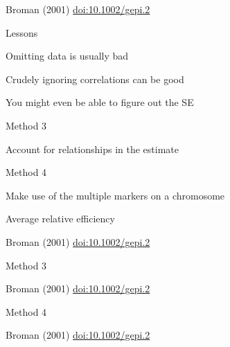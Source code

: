 \documentclass[aspectratio=169,12pt,t]{beamer}
\begin{document}
\begin{frame}[c]{}


\vspace{3mm}

\hfill \footnotesize {\lolit Broman (2001)
  \href{https://doi.org/10.1002/gepi.2}{doi:10.1002/gepi.2}}

\end{frame}


\begin{frame}{Lessons}

  \bbi
  \itemsep36pt
\item Omitting data is usually bad
\item Crudely ignoring correlations can be good
  \bi
\item[] You might even be able to figure out the SE
  \ei
  \ei

  \end{frame}



\begin{frame}{Method 3}

{\hilit Account for relationships in the estimate}


\end{frame}




\begin{frame}{Method 4}

{\hilit Make use of the multiple markers on a chromosome}


\end{frame}





\begin{frame}{Average relative efficiency}

\vspace{10mm}

\hfill \footnotesize {\lolit Broman (2001)
  \href{https://doi.org/10.1002/gepi.2}{doi:10.1002/gepi.2}}

\end{frame}

\begin{frame}{Method 3}

\vspace{18mm}

\hfill \footnotesize {\lolit Broman (2001)
  \href{https://doi.org/10.1002/gepi.2}{doi:10.1002/gepi.2}}

\end{frame}

\begin{frame}{Method 4}

\bigskip

\hfill \footnotesize {\lolit Broman (2001)
  \href{https://doi.org/10.1002/gepi.2}{doi:10.1002/gepi.2}}

\end{frame}
\end{document}
